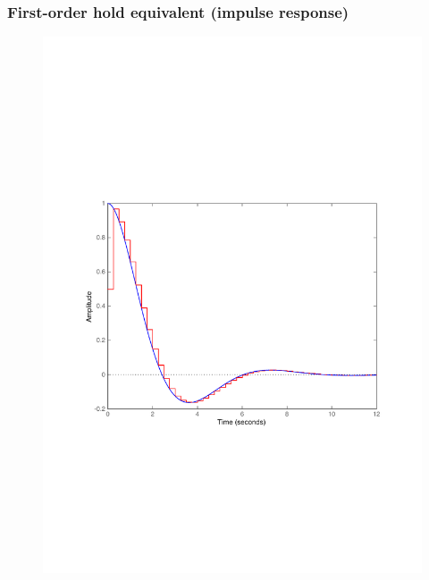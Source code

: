 \begin{frame}
	\frametitle{First-order hold equivalent (impulse response)}
	\vspace{-0.7em}
	\begin{figure}
		\centering
		\includegraphics[width=0.8\linewidth]{vb2I}
	\end{figure}
\end{frame}

